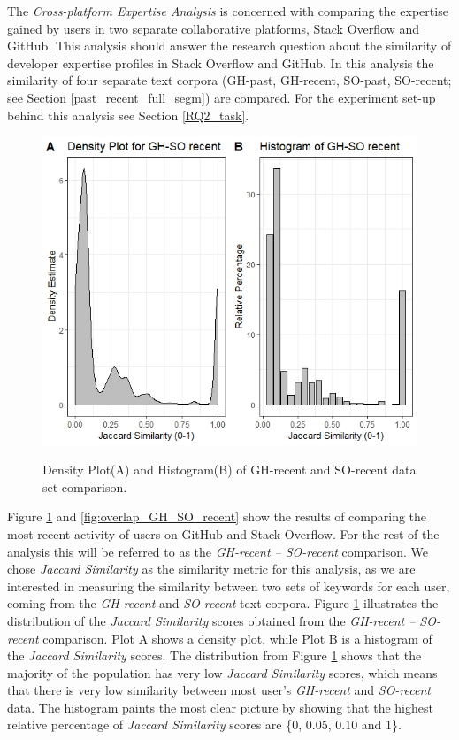         The \emph{Cross-platform Expertise Analysis} is concerned with comparing the expertise gained by users in two separate collaborative platforms, Stack Overflow and GitHub. This analysis should answer the research question about the similarity of developer expertise profiles in Stack Overflow and GitHub. In this analysis the similarity of four separate text corpora (GH-past, GH-recent, SO-past, SO-recent; see Section \ref{past_recent_full_segm}) are compared. For the experiment set-up behind this analysis see Section \ref{RQ2_task}.
        
        \begin{figure}
          \centering
          \includegraphics[width=\textwidth]{figures/GH_SO_recent.jpeg}\\
          \caption{Density Plot(A) and Histogram(B) of GH-recent and SO-recent data set comparison.}
          \label{fig:GH_SO_recent}
        \end{figure}
        
        Figure \ref{fig:GH_SO_recent} and \ref{fig:overlap_GH_SO_recent} show the results of comparing the most recent activity of users on GitHub and Stack Overflow. For the rest of the analysis this will be referred to as the \emph{GH-recent -- SO-recent} comparison. We chose \emph{Jaccard Similarity} as the similarity metric for this analysis, as we are interested in measuring the similarity between two sets of keywords for each user, coming from the \emph{GH-recent} and \emph{SO-recent} text corpora. Figure \ref{fig:GH_SO_recent} illustrates the distribution of the \emph{Jaccard Similarity} scores obtained from the \emph{GH-recent -- SO-recent} comparison. Plot A shows a density plot, while Plot B is a  histogram of the \emph{Jaccard Similarity} scores. The distribution from Figure \ref{fig:GH_SO_recent} shows that the majority of the population has very low \emph{Jaccard Similarity} scores, which means that there is very low similarity between most user's \emph{GH-recent} and \emph{SO-recent} data. The histogram paints the most clear picture by showing that the highest relative percentage of \emph{Jaccard Similarity} scores are \{0, 0.05, 0.10 and 1\}.
        
